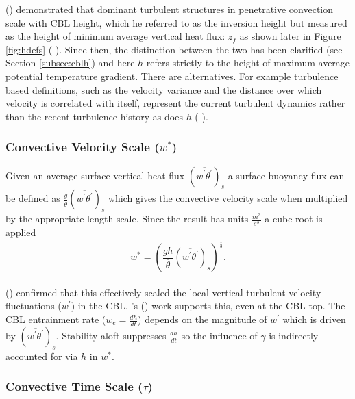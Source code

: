 \citeauthor{Deardorff72} (\citeyear{Deardorff72}) demonstrated that dominant turbulent structures in penetrative convection scale with \acs{CBL} height, which he referred to as the inversion height but measured as the height of minimum average vertical heat flux: $z_{f}$ as shown later in Figure \ref{fig:hdefs} (\citeauthor{DearWill80} \citeyear{DearWill80}).  Since then, the distinction between the two has been clarified (see Section \ref{subsec:cblh}) and here $h$ refers strictly to the height of maximum average potential temperature gradient. There are alternatives. For example turbulence based definitions, such as the velocity variance and the distance over which velocity is correlated with itself, represent the current turbulent dynamics rather than the recent turbulence history as does $h$ (\citeauthor{Traum11} \citeyear{Traum11}).\\

\subsubsection{Convective Velocity Scale ($w^{*}$)}
\label{subsubsec:convel}

Given an average surface vertical heat flux $(\overline{w^{'}\theta^{'}})_{s}$ a surface buoyancy flux can be defined as $\frac{g}{\overline{\theta}}(\overline{w^{'}\theta^{'}})_{s}$ which gives the convective velocity scale when multiplied by the appropriate length scale.  Since the result has units $\frac{m^{3}}{s^{3}}$ a cube root is applied\\

\begin{equation}
w^{*} = \left( \frac{gh}{\overline{\theta}}(\overline{w^{'}\theta^{'}})_{s} \right)^{\frac{1}{3}}.
\end{equation}\\

\citeauthor{Deardorff70} (\citeyear{Deardorff70}) confirmed that this effectively scaled the local vertical turbulent velocity fluctuations ($w^{'}$) in the \acs{CBL}.  \citeauthor{Sorbjan}'s (\citeyear{Sorbjan}) work supports this, even at the \acs{CBL} top.  The \acs{CBL} entrainment rate ($w_{e} = \frac{dh}{dt}$) depends on the magnitude of $w^{'}$ which is driven by $(\overline{w^{'}\theta^{'}})_{s}$. Stability aloft suppresses $\frac{dh}{dt}$ so the influence of $\gamma$ is indirectly accounted for via $h$ in $w^{*}$.\\

\subsubsection{Convective Time Scale ($\tau$)}
\label{subsubsec:}

